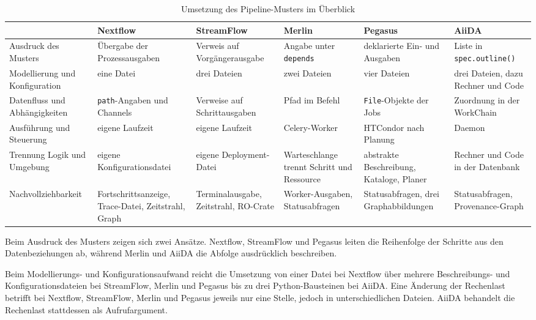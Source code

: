 \begin{table}[H]
  \caption{Umsetzung des Pipeline-Musters im Überblick}
  \label{tab:pipe:vergleich}
  \centering
  \scriptsize
  \setlength{\tabcolsep}{3pt}
  \renewcommand{\arraystretch}{1.4}
  \begin{tabular}{>{\raggedright\arraybackslash}p{2.7cm} >{\raggedright\arraybackslash}p{1.9cm} >{\raggedright\arraybackslash}p{1.9cm} >{\raggedright\arraybackslash}p{1.9cm} >{\raggedright\arraybackslash}p{1.9cm} >{\raggedright\arraybackslash}p{1.9cm}}
    \hline
     & \textbf{Nextflow} & \textbf{Stream\-Flow} & \textbf{Merlin} & \textbf{Pegasus} & \textbf{AiiDA} \\
    \hline
    Ausdruck des Musters & Übergabe der Prozess\-ausgaben & Verweis auf Vorgänger\-ausgabe & Angabe unter \texttt{depends} & deklarierte Ein- und Ausgaben & Liste in \texttt{spec.\allowbreak outline()} \\
    Modellierung und Konfiguration & eine Datei & drei Dateien & zwei Dateien & vier Dateien & drei Dateien, dazu Rechner und Code \\
    Datenfluss und Abhängigkeiten & \texttt{path}-Angaben und Channels & Verweise auf Schritt\-ausgaben & Pfad im Befehl & \texttt{File}-Objekte der Jobs & Zuordnung in der WorkChain \\
    Ausführung und Steuerung & eigene Laufzeit & eigene Laufzeit & Celery-Worker & HTCondor nach Planung & Daemon \\
    Trennung Logik und Umgebung & eigene Konfigu\-rationsdatei & eigene Deployment-Datei & Warteschlange trennt Schritt und Ressource & abstrakte Beschreibung, Kataloge, Planer & Rechner und Code in der Datenbank \\
    Nachvollziehbarkeit & Fortschritts\-anzeige, Trace-Datei, Zeitstrahl, Graph & Terminal\-ausgabe, Zeitstrahl, RO-Crate & Worker-Ausgaben, Status\-abfragen & Status\-abfragen, drei Graph\-abbildungen & Status\-abfragen, Provenance-Graph \\
    \hline
  \end{tabular}
\end{table}

Beim Ausdruck des Musters zeigen sich zwei Ansätze. Nextflow,
StreamFlow und Pegasus leiten die Reihenfolge der Schritte aus den
Datenbeziehungen ab, während Merlin und AiiDA die Abfolge
ausdrücklich beschreiben.

Beim Modellierungs- und Konfigurationsaufwand reicht die Umsetzung
von einer Datei bei Nextflow über mehrere Beschreibungs- und
Konfigurationsdateien bei StreamFlow, Merlin und Pegasus bis zu drei
Python-Bausteinen bei AiiDA. Eine Änderung der Rechenlast betrifft
bei Nextflow, StreamFlow, Merlin und Pegasus jeweils nur eine Stelle,
jedoch in unterschiedlichen Dateien. AiiDA behandelt die Rechenlast
stattdessen als Aufrufargument.

